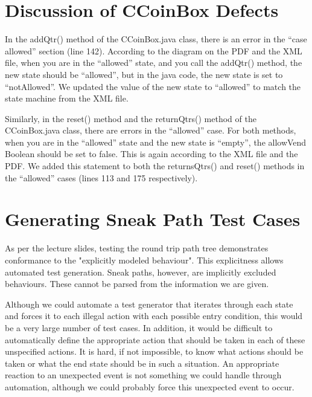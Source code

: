 \documentclass[11pt, a4paper]{article}
\begin{document}
\section{Discussion of CCoinBox Defects}
In the addQtr() method of the CCoinBox.java class, there is an error in the “case allowed” section (line 142). According to the diagram on the PDF and the XML file, when you are in the “allowed” state, and you call the addQtr() method, the new state should be “allowed”, but in the java code, the new state is set to “notAllowed”. We updated the value of the new state to “allowed” to match the state machine from the XML file. 

Similarly, in the reset() method and the returnQtrs() method of the CCoinBox.java class, there are errors in the “allowed” case. For both methods, when you are in the “allowed” state and the new state is “empty”, the allowVend Boolean should be set to false. This is again according to the XML file and the PDF. We added this statement to both the returnsQtrs() and reset() methods in the “allowed” cases (lines 113 and 175 respectively). 

\section{Generating Sneak Path Test Cases}
As per the lecture slides, testing the round trip path tree demonstrates conformance to the "explicitly modeled behaviour". This explicitness allows automated test generation. Sneak paths, however, are implicitly excluded behaviours. These cannot be parsed from the information we are given. 

Although we could automate a test generator that iterates through each state and forces it to each illegal action with each possible entry condition, this would be a very large number of test cases. In addition, it would be difficult to automatically define the appropriate action that should be taken in each of these unspecified actions. It is hard, if not impossible, to know what actions should be taken or what the end state should be in such a situation. An appropriate reaction to an unexpected event is not something we could handle through automation, although we could probably force this unexpected event to occur. 

\end{document}
